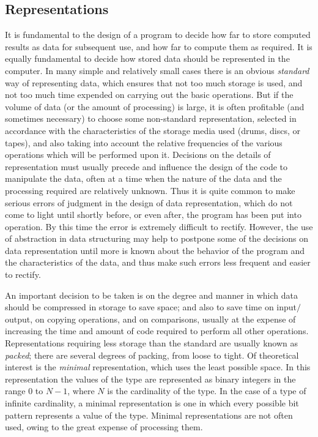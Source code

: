 \subsection{Representations}

It is fundamental to the design of a program to decide how far to store computed results as data for subsequent use, and how far to compute them as required. It is equally fundamental to decide how stored data should be represented in the computer. In many simple and relatively small cases there is an obvious \textit{standard} way of representing data, which ensures that not too much storage is used, and not too much time expended on carrying out the basic operations. But if the volume of data (or the amount of processing) is large, it is often profitable (and sometimes necessary) to choose some non-standard representation, selected in accordance with the characteristics of the storage media used (drums, discs, or tapes), and also taking into account the relative frequencies of the various operations which will be performed upon it. Decisions on the details of representation must usually precede and influence the design of the code to manipulate the data, often at a time when the nature of the data and the processing required are relatively unknown. Thus it is quite common to make serious errors of judgment in the design of data representation, which do not come to light until shortly before, or even after, the program has been put into operation. By this time the error is extremely difficult to rectify. However, the use of abstraction in data structuring may help to postpone some of the decisions on data representation until more is known about the behavior of the program and the characteristics of the data, and thus make such errors less frequent and easier to rectify.

An important decision to be taken is on the degree and manner in which data should be compressed in storage to save space; and also to save time on input$/$output, on copying operations, and on comparisons, usually at the expense of increasing the time and amount of code required to perform all other operations. Representations requiring less storage than the standard are usually known as \textit{packed}; there are several degrees of packing, from loose to tight. Of theoretical interest is the \textit{minimal} representation, which uses the least possible space. In this representation the values of the type are represented as binary integers in the range 0 to $N - 1$, where $N$ is the cardinality of the type. In the case of a type of infinite cardinality, a minimal representation is one in which every possible bit pattern represents a value of the type. Minimal representations are not often used, owing to the great expense of processing them.

